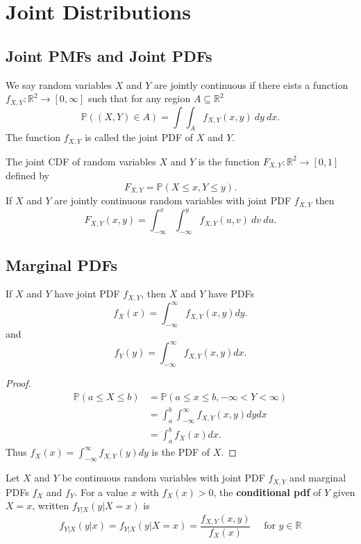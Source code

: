 \section{Joint Distributions}

\subsection{Joint PMFs and Joint PDFs}

\begin{definition}
  We say random variables $X$ and $Y$ are jointly continuous if there eists a function $f_{X,Y} : \mathbb{R}^2 \rightarrow [0, \infty]$ such that for any region $A \subseteq \mathbb{R}^2$
  \[\mathbb{P}((X, Y) \in A) = \int \int_A f_{X,Y}(x,y)\ dy \ dx.\]
  The function $f_{X,Y}$ is called the joint PDF of $X$ and $Y$.
\end{definition}

\begin{definition}
  The joint CDF of random variables $X$ and $Y$ is the function $F_{X,Y} : \mathbb{R}^2 \rightarrow [0,1]$ defined by
  \[F_{X,Y} = \mathbb{P}(X \leq x, Y \leq y).\]
  If $X$ and $Y$ are jointly continuous random variables with joint PDF $f_{X,Y}$ then
  \[F_{X,Y}(x, y) = \int_{-\infty}^x \int_{-\infty}^y f_{X,Y}(u, v) \ dv \ du.\]
\end{definition}

\subsection{Marginal PDFs}

\begin{prop}
  If $X$ and $Y$ have joint PDF $f_{X,Y}$, then $X$ and $Y$ have PDFs
  \[f_X(x) = \int_{-\infty}^\infty f_{X, Y}(x, y) dy.\]
  and
  \[f_Y(y) = \int_{-\infty}^\infty f_{X, Y}(x, y) dx.\]
\end{prop}
\begin{proof}
  \begin{align*}
    \mathbb{P}(a \leq X \leq b) &= \mathbb{P}(a \leq x \leq b, - \infty < Y < \infty) \\
                                &= \int_{a}^{b} \int_{-\infty}^\infty f_{X,Y}(x, y) dy dx \\
                                &= \int_{a}^{b} f_X(x) dx
  .\end{align*}
  Thus $f_X(x) = \int_{-\infty}^\infty f_{X,Y}(y) dy$ is the PDF of $X$.
\end{proof}

\begin{definition}
  Let $X$ and $Y$ be continuous random variables with joint PDF $f_{X,Y}$ and marginal PDFs $f_X$ and $f_Y$. For a value $x$ with $f_X(x) > 0$, the {\bf conditional pdf} of $Y$ given $X = x$, written $f_{Y|X}(y | X = x)$ is
  \[f_{Y|X}(y|x) = f_{Y |X}(y | X = x) = \frac{f_{X,Y}(x,y)}{f_X(x)} \quad \text{ for } y \in \mathbb{R}\]

\end{definition}
